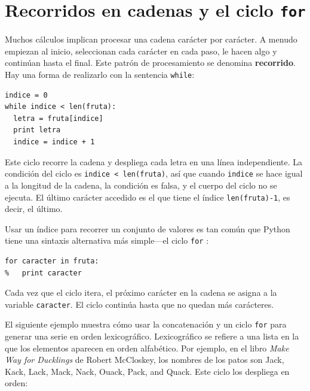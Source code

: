 

\section{Recorridos en cadenas y el ciclo \texttt{for}}
\label{for}

Muchos cálculos implican procesar una cadena carácter por carácter. A 
menudo empiezan al inicio, seleccionan cada carácter en cada paso,
le hacen algo y continúan hasta el final. Este patrón de procesamiento
se denomina  {\bf recorrido}. Hay una forma de realizarlo con la
sentencia \texttt{while}:

\pagebreak
{}
\beforeverb
\begin{verbatim}
indice = 0
while indice < len(fruta):
  letra = fruta[indice]
  print letra
  indice = indice + 1
\end{verbatim}
\afterverb
%
Este ciclo recorre la cadena y despliega cada letra en una línea
independiente. La condición del ciclo es \texttt{indice < len(fruta)}, así
que cuando \texttt{indice} se hace igual a la longitud de la cadena,
la condición es falsa, y el cuerpo del ciclo no se ejecuta. El 
último carácter accedido es el que tiene el índice \texttt{len(fruta)-1},
es decir, el último.

Usar un índice para recorrer un conjunto de valores es tan común
que Python tiene una sintaxis alternativa más simple---el ciclo \texttt{for} :

\beforeverb
\begin{verbatim}
for caracter in fruta:
%   print caracter
\end{verbatim}
\afterverb
%

Cada vez que el ciclo itera, el próximo carácter en la cadena se asigna
a la variable \texttt{caracter}. El ciclo continúa hasta que no quedan más
carácteres.


El siguiente ejemplo muestra cómo usar la concatenación y un
ciclo  \texttt{for} para generar una serie en orden lexicográfico.
Lexicográfico se refiere a una lista en la que los elementos
aparecen en orden alfabético. Por ejemplo, en el libro 
{\em Make Way for Ducklings} de  Robert McCloskey,  los 
nombres de los patos son  Jack, Kack, Lack, Mack,
Nack, Ouack, Pack, and Quack.  Este ciclo los despliega
en orden:

